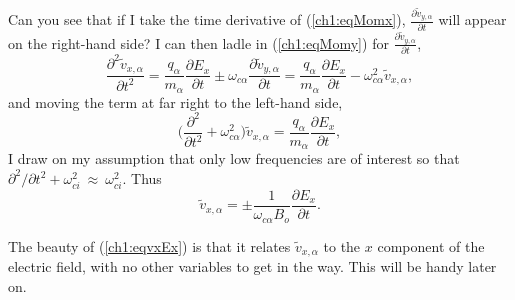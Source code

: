 Can you see that if I take the time derivative of (\ref{ch1:eqMomx}),
$\frac{\partial \tilde v_{y,\alpha}}{\partial t}$ will appear on the right-hand
side?  I can then ladle in (\ref{ch1:eqMomy}) for
$\frac{\partial \tilde v_{y,\alpha}}{\partial t}$,
\begin{equation*} \label{ch1:eqMomxdt} \dfrac{\partial^2 \tilde
    v_{x,\alpha}}{\partial t^2} = \dfrac{q_\alpha}{m_\alpha}\dfrac{\partial
    E_x}{\partial t} \pm \omega_{c \alpha} \dfrac{\partial \tilde
    v_{y,\alpha}}{\partial t} = \dfrac{q_\alpha}{m_\alpha}\dfrac{\partial
    E_x}{\partial t} - \omega_{c \alpha}^2 \tilde v_{x,\alpha},
\end{equation*}
and moving the term at far right to the left-hand side,
\begin{equation*} \Big ( \dfrac{\partial^2}{\partial t^2} + \omega_{c \alpha}^2
  \Big ) \tilde v_{x,\alpha} = \dfrac{q_\alpha}{m_\alpha}\dfrac{\partial E_x}{\partial
    t},
\end{equation*}
I draw on my assumption that only low frequencies are of interest so that
$\partial^2 / \partial t^2 + \omega_{c i}^2~\approx~\omega_{c i}^2$. Thus
\begin{equation} \label{ch1:eqvxEx}
  \tilde v_{x,\alpha} = \pm \dfrac{1}{\omega_{c \alpha} B_o}\dfrac{\partial
    E_x}{\partial t}.
\end{equation}

The beauty of (\ref{ch1:eqvxEx}) is that it relates $\tilde v_{x,\alpha}$ to the
$x$ component of the electric field, with no other variables to get in the
way. This will be handy later on.

